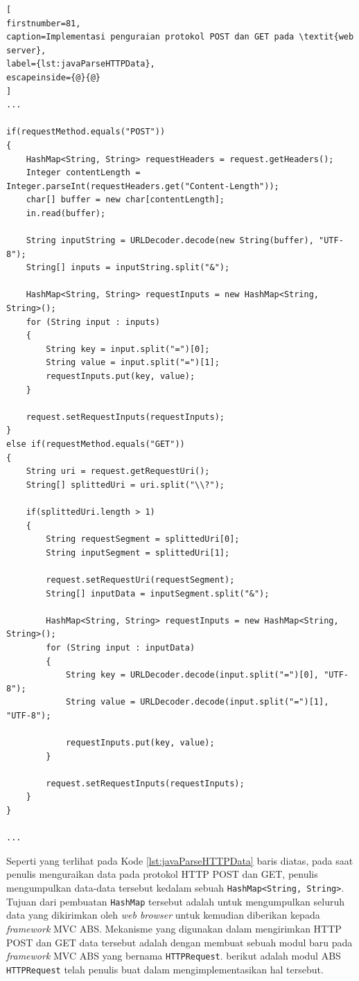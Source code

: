 \begin{lstlisting}[
firstnumber=81,
caption=Implementasi penguraian protokol POST dan GET pada \textit{web server},
label={lst:javaParseHTTPData},
escapeinside={@}{@}
]
...

if(requestMethod.equals("POST"))
{
   	HashMap<String, String> requestHeaders = request.getHeaders();
   	Integer contentLength = Integer.parseInt(requestHeaders.get("Content-Length"));
   	char[] buffer = new char[contentLength];
   	in.read(buffer);
   	
   	String inputString = URLDecoder.decode(new String(buffer), "UTF-8");
   	String[] inputs = inputString.split("&");
   	
   	HashMap<String, String> requestInputs = new HashMap<String, String>();
   	for (String input : inputs) 
   	{
		String key = input.split("=")[0];
		String value = input.split("=")[1];
		requestInputs.put(key, value);
	}
            	
    request.setRequestInputs(requestInputs);
}
else if(requestMethod.equals("GET"))
{
   	String uri = request.getRequestUri();
   	String[] splittedUri = uri.split("\\?");
   	
   	if(splittedUri.length > 1)
   	{
   		String requestSegment = splittedUri[0];
   		String inputSegment = splittedUri[1];
   		
   		request.setRequestUri(requestSegment);
   		String[] inputData = inputSegment.split("&");

   		HashMap<String, String> requestInputs = new HashMap<String, String>();
   		for (String input : inputData) 
   		{
   			String key = URLDecoder.decode(input.split("=")[0], "UTF-8");
   			String value = URLDecoder.decode(input.split("=")[1], "UTF-8");
   			
   			requestInputs.put(key, value);
		}
            		
   		request.setRequestInputs(requestInputs);
   	}
}

...
\end{lstlisting}

Seperti yang terlihat pada Kode \ref{lst:javaParseHTTPData} baris diatas, pada saat penulis menguraikan data pada protokol HTTP POST dan GET, penulis mengumpulkan data-data tersebut kedalam sebuah \texttt{HashMap<String, String>}. Tujuan dari pembuatan \texttt{HashMap} tersebut adalah untuk mengumpulkan seluruh data yang dikirimkan oleh \textit{web browser} untuk kemudian diberikan kepada \textit{framework} MVC ABS. Mekanisme yang digunakan dalam mengirimkan HTTP POST dan GET data tersebut adalah dengan membuat sebuah modul baru pada \textit{framework} MVC ABS yang bernama \texttt{HTTPRequest}. berikut adalah modul ABS \texttt{HTTPRequest} telah penulis buat dalam mengimplementasikan hal tersebut.

